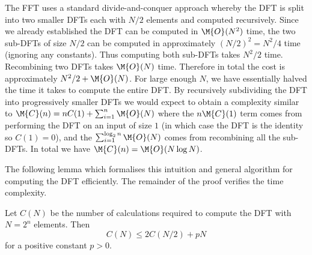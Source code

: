 The FFT uses a standard divide-and-conquer approach whereby the DFT is split into two smaller DFTs each with $N/2$ elements and computed recursively. Since we already established the DFT can be computed in $\M{O}(N^2)$ time, the two sub-DFTs of size $N/2$ can be computed in approximately $(N/2)^2 = N^2/4$ time (ignoring any constants). Thus computing both sub-DFTs takes $N^2 / 2$ time.\\
Recombining two DFTs takes $\M{O}(N)$ time. Therefore in total the cost is approximately $N^2/2 + \M{O}(N)$. For large enough $N$, we have essentially halved the time it takes to compute the entire DFT. By recursively subdividing the DFT into progressively smaller DFTs we would expect to obtain a complexity similar to $\M{C}(n) = nC(1) + \sum^n_{i=1} \M{O}(N)$ where the $n\M{C}(1)$ term comes from performing the DFT on an input of size $1$ (in which case the DFT is the identity so $C(1) = 0$), and the $\sum^{\log_2 n}_{i=1} \M{O}(N)$ comes from recombining all the sub-DFTs. In total we have $\M{C}(n) = \M{O}(N \log N)$.

The following lemma which formalises this intuition and general algorithm for computing the DFT efficiently. The remainder of the proof verifies the time complexity.

\begin{lemma}
    Let $C(N)$ be the number of calculations required to compute the DFT with $N = 2^n$ elements. Then
    \begin{equation}
        C(N) \le 2 C(N/2) + pN \label{eq:fftlem}
    \end{equation}
    for a positive constant $p > 0$.
\end{lemma}

